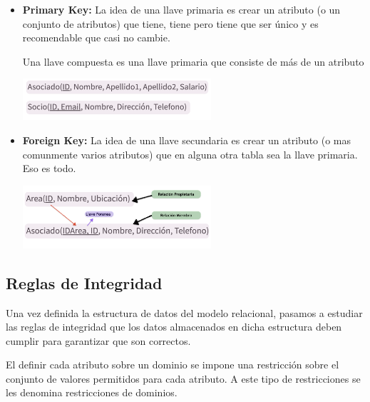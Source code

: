 \documentclass[12pt, fleqn]{report}                             %
\begin{document}
                \begin{itemize}
                    \item
                        \textbf{Primary Key:}
                        La idea de una llave primaria es crear un atributo (o un conjunto de 
                        atributos) que tiene, tiene pero tiene que ser único y es recomendable
                        que casi no cambie.

                        Una llave compuesta es una llave primaria que consiste de más de un atributo

                        \includegraphics[width=0.55\textwidth]{LlavesPrimarias}

                    \item
                        \textbf{Foreign Key:}
                        La idea de una llave secundaria es crear un atributo (o mas comunmente
                        varios atributos) que en alguna otra tabla sea la llave primaria. Eso es todo.

                        \includegraphics[width=0.55\textwidth]{LlaveForanea}

                \end{itemize}


            \clearpage
            \subsection{Reglas de Integridad}

                Una vez definida la estructura de datos del modelo relacional, pasamos a estudiar
                las reglas de integridad que los datos almacenados en dicha estructura deben
                cumplir para garantizar que son correctos.

                El definir cada atributo sobre un dominio se impone una restricción sobre el
                conjunto de valores permitidos para cada atributo. A este tipo de restricciones
                se les denomina restricciones de dominios.
\end{document}
